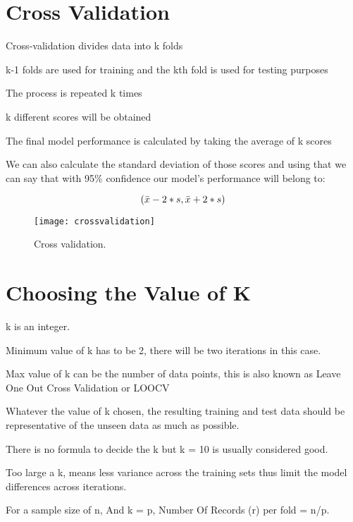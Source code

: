 	\section{Cross Validation}
	\begin{bulletedlist}
		\item Cross-validation divides data into k folds
		\item k-1 folds are used for training and the kth fold is used for testing purposes
		\item The process is repeated k times
		\item k different scores will be obtained
		\item The final model performance is calculated by taking the average of k scores
		\item We can also calculate the standard deviation of those scores and using that we can say that with 95\% confidence our model's performance will belong to:
	\end{bulletedlist}
	\begin{equation}
		\left(\mbox{$\bar{x}$} - 2*\mbox{$s$}{}, \mbox{$\bar{x}$} + 2*\mbox{$s$}{}\right)
	\end{equation}
	\begin{figure}[h]
		\centering
		\texttt{[image: crossvalidation]}
		\caption{Cross validation.}
		\label{fig:normaldistrution}
	\end{figure}


	\section{Choosing the Value of K}
	\begin{bulletedlist}
		\item k is an integer.
		\item Minimum value of k has to be 2, there will be two iterations in this case.
		\item Max value of k can be the number of data points, this is also known as Leave One Out Cross Validation or LOOCV
		\item Whatever the value of k chosen, the resulting training and test data should be representative of the unseen data as much as possible.
		\item There is no formula to decide the k but k = 10 is usually considered good.
		\item Too large a k, means less variance across the training sets thus limit the model differences across iterations.
		\item For a sample size of n, And k = p, Number Of Records (r) per fold = n/p.
	\end{bulletedlist}


